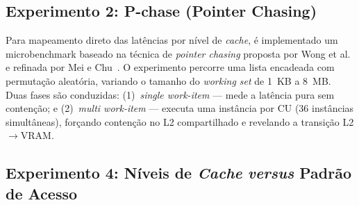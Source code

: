 %
%
%
%



\subsection{Experimento 2: P-chase (Pointer Chasing)}

Para mapeamento direto das latências por nível de \textit{cache}, é implementado um microbenchmark baseado na técnica de \textit{pointer chasing} proposta por Wong et al.~\cite{wong2010} e refinada por Mei e Chu~\cite{mei2017}. O experimento percorre uma lista encadeada com permutação aleatória, variando o tamanho do \textit{working set} de 1~KB a 8~MB. Duas fases são conduzidas: (1)~\textit{single work-item} --- mede a latência pura sem contenção; e (2)~\textit{multi work-item} --- executa uma instância por CU (36 instâncias simultâneas), forçando contenção no L2 compartilhado e revelando a transição L2$\to$VRAM.


\subsection{Experimento 4: Níveis de \textit{Cache} \textit{versus} Padrão de Acesso}

